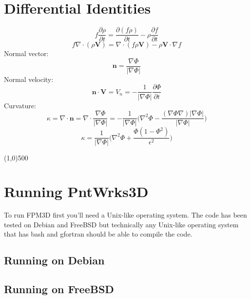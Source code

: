 \documentclass[12pt]{extarticle}
\begin{document}
\section*{Differential Identities}
\begin{equation}
f \frac{\partial \rho}{\partial t} = \frac{\partial (f \rho)}{\partial t} - \rho \frac{\partial f}{ \partial t}
\end{equation}
\begin{equation}
f \nabla \cdot  (\rho \textbf{V}) = \nabla \cdot  (f \rho \textbf{V}) - \rho \textbf{V} \cdot  \nabla f
\end{equation}
Normal vector:
\begin{equation}
\label{curvature}
\textbf{n} = \frac{\nabla \Phi}{|\nabla \Phi|}
\end{equation}
Normal velocity:
\begin{equation}
\textbf{n} \cdot \textbf{V} = V_{n} = - \frac{1}{| \nabla \Phi |} \frac{\partial \Phi}{ \partial t}
\end{equation}
Curvature:
\begin{equation}
\label{curvature}
\kappa = \nabla \cdot  \textbf{n} = \nabla \cdot  \frac{\nabla \Phi}{|\nabla \Phi|} = - \frac{1}{| \nabla \Phi|} \Big( \nabla^{2} \Phi - \frac{(\nabla \Phi \nabla) | \nabla \Phi|}{| \nabla \Phi|} \Big)
\end{equation}
\begin{equation}
\label{curvature}
\kappa = \frac{1}{| \nabla \Phi|} \Big( \nabla^{2} \Phi + \frac{\Phi (1 - \Phi^{2})}{\epsilon^{2}} \Big)
\end{equation}
\begin{center}
\line(1,0){500}
\end{center}

\section{Running PntWrks3D}
To run FPM3D first you'll need a Unix-like operating system. The code has been tested on Debian and FreeBSD but technically any Unix-like operating system that has bash and gfortran should be able to compile the code. 

\subsection{Running on Debian}

\subsection{Running on FreeBSD}

\end{document}
